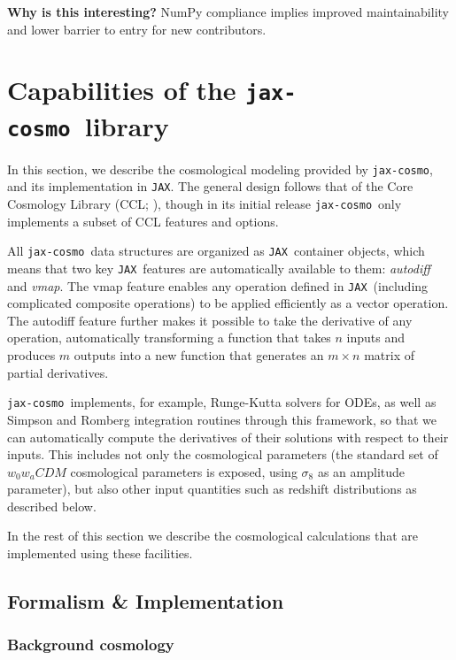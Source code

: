 \documentclass[twocolumn,twocolappendix,nofootinbib,iop]{openjournal}
\newcommand{\jaxcosmo}{\texttt{jax-cosmo}}
\newcommand{\jax}{\texttt{JAX}}
\begin{document}
\textbf{Why is this interesting?} NumPy compliance implies improved maintainability and lower barrier to entry for new contributors.


\section{Capabilities of the \jaxcosmo\ library}
\label{sec-jaxcosmo-design}

In this section, we describe the cosmological modeling provided by \jaxcosmo, and its implementation in \jax. The general design follows that of the Core Cosmology Library (CCL; \citealp{2019ApJS..242....2C}), though in its initial release
 \jaxcosmo\ only implements a subset of CCL features and options.

All \jaxcosmo\ data structures are organized as \jax\ container objects, which means that two key \jax\ features are automatically available to them: \textit{autodiff} and \textit{vmap}. The vmap feature enables any operation defined in \jax\ (including complicated composite operations) to be applied efficiently as a vector operation. The autodiff feature further makes it possible to take the derivative of any operation, automatically transforming a function that takes $n$ inputs and produces $m$ outputs into a new function that generates an $m \times n$ matrix of partial derivatives.

\jaxcosmo\ implements, for example, Runge-Kutta solvers for ODEs, as well as Simpson and Romberg integration routines through this framework, so that we can automatically compute the derivatives of their solutions with respect to their inputs. This includes not only the cosmological parameters (the standard set of $w_0 w_a CDM$ cosmological parameters is exposed, using $\sigma_8$ as an amplitude parameter), but also other input quantities such as redshift distributions as described below.

In the rest of this section we describe the cosmological calculations that are implemented using these facilities.
\subsection{Formalism \& Implementation}

\subsubsection{Background cosmology}
\end{document}
